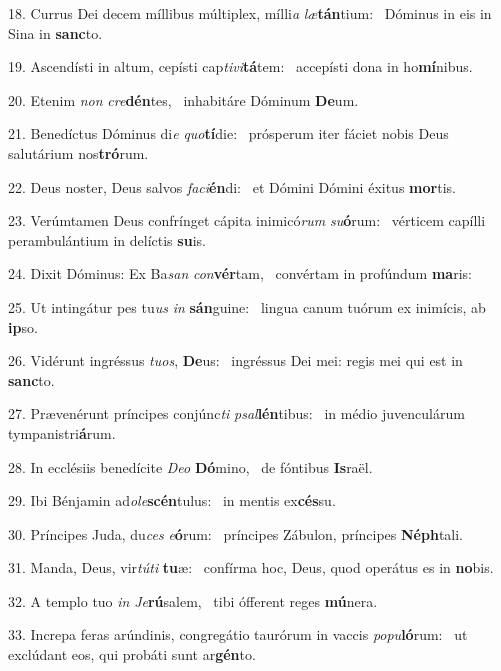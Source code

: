 18. Currus Dei decem míllibus múltiplex, mílli\textit{a} \textit{læ}\textbf{tán}tium: \ast\  Dóminus in eis in Sina in \textbf{sanc}to.\

19. Ascendísti in altum, cepísti cap\textit{ti}\textit{vi}\textbf{tá}tem: \ast\  accepísti dona in ho\textbf{mí}nibus.\

20. Etenim \textit{non} \textit{cre}\textbf{dén}tes, \ast\  inhabitáre Dóminum \textbf{De}um.\

21. Benedíctus Dóminus di\textit{e} \textit{quo}\textbf{tí}die: \ast\  prósperum iter fáciet nobis Deus salutárium nos\textbf{tró}rum.\

22. Deus noster, Deus salvos \textit{fa}\textit{ci}\textbf{én}di: \ast\  et Dómini Dómini éxitus \textbf{mor}tis.\

23. Verúmtamen Deus confrínget cápita inimicó\textit{rum} \textit{su}\textbf{ó}rum: \ast\  vérticem capílli perambulántium in delíctis \textbf{su}is.\

24. Dixit Dóminus: Ex Ba\textit{san} \textit{con}\textbf{vér}tam, \ast\  convértam in profúndum \textbf{ma}ris:\

25. Ut intingátur pes tu\textit{us} \textit{in} \textbf{sán}guine: \ast\  lingua canum tuórum ex inimícis, ab \textbf{ip}so.\

26. Vidérunt ingréssus \textit{tu}\textit{os}, \textbf{De}us: \ast\  ingréssus Dei mei: regis mei qui est in \textbf{sanc}to.\

27. Prævenérunt príncipes conjúnc\textit{ti} \textit{psal}\textbf{lén}tibus: \ast\  in médio juvenculárum tympanistri\textbf{á}rum.\

28. In ecclésiis benedícite \textit{De}\textit{o} \textbf{Dó}mino, \ast\  de fóntibus \textbf{Is}raël.\

29. Ibi Bénjamin ad\textit{o}\textit{le}\textbf{scén}tulus: \ast\  in mentis ex\textbf{cés}su.\

30. Príncipes Juda, du\textit{ces} \textit{e}\textbf{ó}rum: \ast\  príncipes Zábulon, príncipes \textbf{Néph}tali.\

31. Manda, Deus, vir\textit{tú}\textit{ti} \textbf{tu}æ: \ast\  confírma hoc, Deus, quod operátus es in \textbf{no}bis.\

32. A templo tuo \textit{in} \textit{Je}\textbf{rú}salem, \ast\  tibi ófferent reges \textbf{mú}nera.\

33. Increpa feras arúndinis, congregátio taurórum in vaccis \textit{po}\textit{pu}\textbf{ló}rum: \ast\  ut exclúdant eos, qui probáti sunt ar\textbf{gén}to.\

